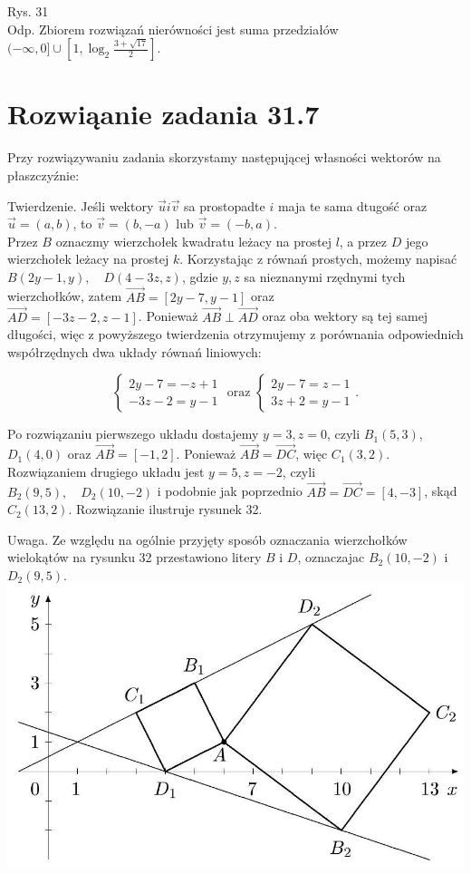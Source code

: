 \documentclass[10pt]{article}
\begin{document}
Rys. 31\\
Odp. Zbiorem rozwiązań nierówności jest suma przedziałów $(-\infty, 0] \cup\left[1, \log _{2} \frac{3+\sqrt{17}}{2}\right]$.

\section*{Rozwiąanie zadania 31.7}
Przy rozwiązywaniu zadania skorzystamy następującej własności wektorów na płaszczyźnie:

Twierdzenie. Jeśli wektory $\vec{u} i \vec{v}$ sa prostopadte $i$ maja te sama dtugość oraz $\vec{u}=(a, b)$, to $\vec{v}=(b,-a)$ lub $\vec{v}=(-b, a)$.\\
Przez $B$ oznaczmy wierzchołek kwadratu leżacy na prostej $l$, a przez $D$ jego wierzchołek leżacy na prostej $k$. Korzystając z równań prostych, możemy napisać $B(2 y-1, y), \quad D(4-3 z, z)$, gdzie $y, z$ sa nieznanymi rzędnymi tych wierzchołków, zatem $\overrightarrow{A B}=[2 y-7, y-1]$ oraz\\
$\overrightarrow{A D}=[-3 z-2, z-1]$. Ponieważ $\overrightarrow{A B} \perp \overrightarrow{A D}$ oraz oba wektory są tej samej długości, więc z powyższego twierdzenia otrzymujemy z porównania odpowiednich współrzędnych dwa układy równań liniowych:

$$
\left\{\begin{array} { c } 
{ 2 y - 7 = - z + 1 } \\
{ - 3 z - 2 = y - 1 }
\end{array} \text { oraz } \left\{\begin{array}{l}
2 y-7=z-1 \\
3 z+2=y-1
\end{array} .\right.\right.
$$

Po rozwiązaniu pierwszego układu dostajemy $y=3, z=0$, czyli $B_{1}(5,3)$, $D_{1}(4,0)$ oraz $\overrightarrow{A B}=[-1,2]$. Ponieważ $\overrightarrow{A B}=\overrightarrow{D C}$, więc $C_{1}(3,2)$. Rozwiązaniem drugiego układu jest $y=5, z=-2$, czyli $B_{2}(9,5), \quad D_{2}(10,-2)$ i podobnie jak poprzednio $\overrightarrow{A B}=\overrightarrow{D C}=[4,-3]$, skąd $C_{2}(13,2)$. Rozwiązanie ilustruje rysunek 32.

Uwaga. Ze względu na ogólnie przyjęty sposób oznaczania wierzchołków wielokątów na rysunku 32 przestawiono litery $B$ i $D$, oznaczajac $B_{2}(10,-2)$ i $D_{2}(9,5)$.\\
\includegraphics[max width=\textwidth, center]{2024_11_16_fe5b564401bf7db98894g-129}
\end{document}
